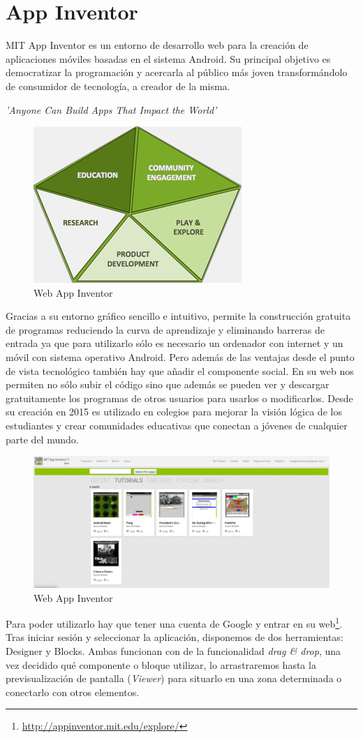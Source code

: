 \documentclass[a4paper, 12pt]{book}
\begin{document}
\section{App Inventor} 
\label{sec:seccion1}
MIT App Inventor es un entorno de desarrollo web para la creación de aplicaciones móviles basadas en el sistema Android. Su principal objetivo es democratizar la programación y acercarla al público más joven transformándolo de consumidor de tecnología, a creador de la misma.
\begin{center}
        \textit{'Anyone Can Build Apps That Impact the World'}
\end{center}
\begin{figure}[H]
  \centering
  \includegraphics[width=0.40\linewidth, keepaspectratio]{img/usesview}
  \caption{Web App Inventor}
  \label{fig:appinventorgallery}
\end{figure}
Gracias a su entorno gráfico sencillo e intuitivo, permite la construcción gratuita de programas reduciendo la curva de aprendizaje y eliminando barreras de entrada ya que para utilizarlo sólo es necesario un ordenador con internet y un móvil con sistema operativo Android. Pero además de las ventajas desde el punto de vista tecnológico también hay que añadir el componente social. En su web nos permiten no sólo subir el código sino que además se pueden ver y descargar gratuitamente los programas de otros usuarios para usarlos o modificarlos. Desde su creación en 2015 es utilizado en colegios para mejorar la visión lógica de los estudiantes y crear comunidades educativas que conectan a jóvenes de cualquier parte del mundo. 
\begin{figure}[H]
  \centering
  \includegraphics[width=0.90\linewidth, keepaspectratio]{img/appinventorgallery}
  \caption{Web App Inventor}
  \label{fig:appinventorgallery}
\end{figure} 
Para poder utilizarlo hay que tener una cuenta de Google y entrar en su web\footnote{\url{http://appinventor.mit.edu/explore/}}. Tras iniciar sesión y seleccionar la aplicación, disponemos de dos herramientas: Designer y Blocks. Ambas funcionan con de la funcionalidad \textit{drag \& drop}, una vez decidido qué componente o bloque utilizar, lo arrastraremos hasta la previsualización de pantalla (\textit{Viewer}) para situarlo en una zona determinada o conectarlo con otros elementos.
\end{document}
